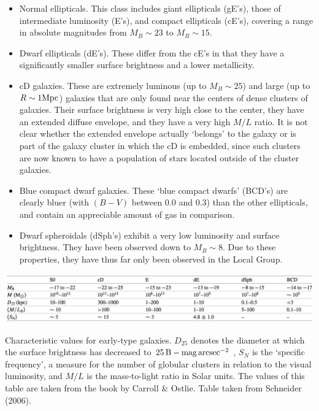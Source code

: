 \documentclass[a4paper,11pt]{article}
\begin{document}
\begin{itemize}
    \item Normal ellipticals. This class includes giant ellipticals (gE's), those of intermediate luminosity (E's), and compact ellipticals (cE's), covering a range in absolute magnitudes from $M_B\sim23$ to $M_B\sim15$.
    \item Dwarf ellipticals (dE's). These differ from the cE's in that they have a significantly smaller surface brightness and a lower metallicity.
    \item cD galaxies. These are extremely luminous (up to $M_B\sim25$) and large (up to $R\sim1{\rm Mpc}$) galaxies that are only found near the centers of dense clusters of galaxies. Their surface brightness is very high close to the center, they have an extended diffuse envelope, and they have a very high $M/L$ ratio. It is not clear whether the extended envelope actually `belongs' to the galaxy or is part of the galaxy cluster in which the cD is embedded, since such clusters are now known to have a population of stars located outside of the cluster galaxies.
    \item Blue compact dwarf galaxies. These `blue compact dwarfs' (BCD’s) are clearly bluer (with $(B-V)$ between $0.0$ and $0.3$) than the other ellipticals, and contain an appreciable amount of gas in comparison.
    \item Dwarf spheroidals (dSph's) exhibit a very low luminosity and surface brightness. They have been observed down to $M_B\sim8$. Due to these properties, they have thus far only been observed in the Local Group.
\end{itemize}

\begin{table}[t]
    \centering
    \includegraphics[width=16cm]{figures/EarlyGalaxies.png}
    \caption{\footnotesize{Characteristic values for early-type galaxies. $D_{25}$ denotes the diameter at which the surface brightness has decreased to $25\,{\rm B-mag\,arcsec^{-2}}$ , $S_N$ is the `specific frequency', a measure for the number of globular clusters in relation to the visual luminosity, and $M/L$ is the mass-to-light ratio in Solar units. The values of this table are taken from the book by Carroll \& Ostlie. Table taken from Schneider (2006).}}
    \label{table:earlygalaxies}
\end{table}
\end{document}
